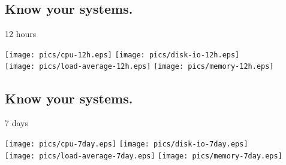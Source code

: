 \documentclass[xga]{xdvislides}
\begin{document}
\subsection{Know your systems.}
12 hours
\begin{center}
	\texttt{[image: pics/cpu-12h.eps]}
	\texttt{[image: pics/disk-io-12h.eps]} \\
	\texttt{[image: pics/load-average-12h.eps]}
	\texttt{[image: pics/memory-12h.eps]} \\
\end{center}

\subsection{Know your systems.}
7 days
\begin{center}
	\texttt{[image: pics/cpu-7day.eps]}
	\texttt{[image: pics/disk-io-7day.eps]} \\
	\texttt{[image: pics/load-average-7day.eps]}
	\texttt{[image: pics/memory-7day.eps]} \\
\end{center}



%
%
%
%
%
\end{document}
